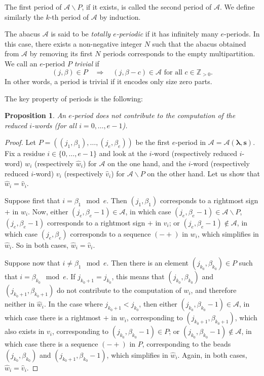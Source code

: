 \documentclass[twoside,12pt]{amsart}
\theoremstyle{plain}
\newcommand{\cA}{\mathcal{A}}
\newcommand{\Z}{\mathbb{Z}}
\newcommand{\bs}{\mathbf{s}}
\newcommand{\be}{\beta}
\newcommand{\la}{\lambda}
\newcommand{\bla}{\boldsymbol{\la}}
\newcommand{\hw}{\widehat{w}}
\newcommand{\hv}{\widehat{v}}
\newcommand{\Ra}{\Rightarrow}
\newtheorem{prop}[num]{Proposition}
\theoremstyle{remark}
\begin{document}
The first period of $\cA \backslash P$, if it exists, is called the second period of $\cA$.
We define similarly the $k$-th period of $\cA$ by induction.

The abacus $\cA$ is said to be \textit{totally $e$-periodic} if it has 
infinitely many $e$-periods.
In this case, there exists a non-negative integer $N$ such that the abacus obtained 
from $\cA$ by removing its first $N$ periods corresponds to the empty multipartition.
We call an $e$-period $P$ \textit{trivial} if 
$$(j,\be)\in P \quad \Ra \quad (j,\be-c)\in\cA \text{ for all } c\in\Z_{>0}.$$
In other words, a period is trivial if it encodes only size zero parts.

The key property of periods is the following:

\begin{prop}\label{prop_period}
An $e$-period does not contribute to the computation of the 
reduced $i$-words (for all $i=0,\dots,e-1$).
\end{prop}

\begin{proof}
Let $P=((j_1,\be_1), \dots, (j_e,\be_e))$ be the first $e$-period in $\cA=\cA(\bla,\bs)$.
Fix a residue $i\in\{0,\dots,e-1\}$ and look at the $i$-word (respectively reduced $i$-word) $w_i$
(respectively $\hw_i$) for $\cA$ on the one hand,
and the $i$-word (respectively reduced $i$-word) $v_i$
(respectively $\hv_i$) for $\cA\backslash P$ on the other hand.
Let us show that $\hw_i=\hv_i$.

Suppose first that $i=\be_1\mod e$.
Then $(j_1,\be_1)$ corresponds to a rightmost sign $+$ in $w_i$.
Now, either $(j_e,\be_e-1)\in\cA$, in which case $(j_e,\be_e-1)\in\cA\backslash P$,
$(j_e,\be_e-1)$ corresponds to a rightmost sign $+$ in $v_i$;
or $(j_e,\be_e-1)\notin\cA$, in which case $(j_e,\be_e)$ corresponds to a sequence $(-+)$
in $w_i$, which simplifies in $\hw_i$.
So in both cases, $\hw_i=\hv_i$.

Suppose now that $i\neq\be_1\mod e$.
Then there is an element $(j_{k_0},\be_{k_0})\in P$ such that $i=\be_{k_0}\mod e$.
If $j_{k_0+1} = j_{k_0}$, this means that $(j_{k_0},\be_{k_0})$ and $(j_{k_0+1},\be_{k_0+1})$
do not contribute to the computation of $w_i$, and therefore neither in $\hw_i$.
In the case where $j_{k_0+1} < j_{k_0}$, then either
$(j_{k_0},\be_{k_0}-1)\in \cA$, in which case there is a rightmost $+$ in $w_i$, corresponding to $(j_{k_0+1},\be_{k_0+1})$,
which also exists in $v_i$, corresponding to $(j_{k_0},\be_{k_0}-1)\in P$;
or $(j_{k_0},\be_{k_0}-1)\notin \cA$, in which case there is a sequence $(-+)$ in $P$,
corresponding to the beads $(j_{k_0},\be_{k_0})$ and $(j_{k_0+1},\be_{k_0}-1)$,
which simplifies in $\hw_i$.
Again, in both cases, $\hw_i=\hv_i$.
\end{proof}
\end{document}
